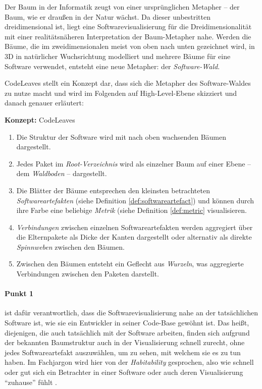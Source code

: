 Der Baum in der Informatik zeugt von einer ursprünglichen Metapher -- der Baum, wie er draußen in der Natur wächst. Da dieser unbestritten dreidimensional ist, liegt eine Softwarevisualisierung für die Dreidimensionalität mit einer realitätsnäheren Interpretation der Baum-Metapher nahe. Werden die Bäume, die im zweidimensionalen meist von oben nach unten gezeichnet wird, in 3D in natürlicher Wuchsrichtung modelliert und mehrere Bäume für eine Software verwendet, entsteht eine neue Metapher: der \emph{Software-Wald}.

CodeLeaves stellt ein Konzept dar, dass sich die Metapher des Software-Waldes zu nutze macht und wird im Folgenden auf High-Level-Ebene skizziert und danach genauer erläutert:

\begin{titlebox}{\textbf{Konzept:} CodeLeaves}
  \begin{enumerate}[leftmargin=1em]
    \item Die Struktur der Software wird mit nach oben wachsenden Bäumen dargestellt.
    \item Jedes Paket im \emph{Root-Verzeichnis} wird als einzelner Baum auf einer Ebene -- dem \emph{Waldboden} -- dargestellt.
    \item Die Blätter der Bäume entsprechen den kleinsten betrachteten \textit{Softwareartefakten} (siehe Definition \ref{def:softwareartefact}) und können durch ihre Farbe eine beliebige \textit{Metrik} (siehe Definition \ref{def:metric} visualisieren.
    \item \textit{Verbindungen} zwischen einzelnen Softwareartefakten werden aggregiert über die Elternpakete als Dicke der Kanten dargestellt oder alternativ als direkte \emph{Spinnweben} zwischen den Bäumen.
    \item Zwischen den Bäumen entsteht ein Geflecht aus \emph{Wurzeln}, was aggregierte Verbindungen zwischen den Paketen darstellt.
  \end{enumerate}
\end{titlebox}

\paragraph{Punkt 1} ist dafür verantwortlich, dass die Softwarevisualisierung nahe an der tatsächlichen Software ist, wie sie ein Entwickler in seiner Code-Base gewöhnt ist. Das heißt, diejenigen, die auch tatsächlich mit der Software arbeiten, finden sich aufgrund der bekannten Baumstruktur auch in der Visualisierung schnell zurecht, ohne jedes Softwareartefakt auszuwählen, um zu sehen, mit welchem sie es zu tun haben. Im Fachjargon wird hier von der \emph{Habitability} gesprochen, also wie schnell oder gut sich ein Betrachter in einer Software oder auch deren Visualisierung "`zuhause"' fühlt \cite{wettel2007program}.

